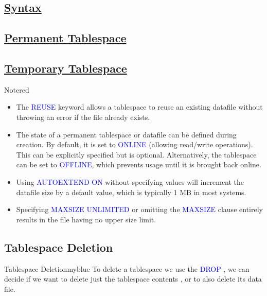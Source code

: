 \vspace{0.15cm}

\subsection*{\underline{Syntax}}

\subsection*{\underline{Permanent Tablespace}}



\subsection*{\underline{Temporary Tablespace}}




\vspace{0.25cm}

\begin{prettyBox}{Note}{red}
\begin{itemize}
    \item The \textcolor{blue}{REUSE} keyword allows a tablespace to reuse an existing 
          datafile without throwing an error if the file already exists.
    \item The state of a permanent tablespace or datafile can be defined during creation. By default, 
          it is set to \textcolor{blue}{ONLINE} (allowing read/write operations). This can be explicitly 
          specified but is optional. Alternatively, the tablespace can be set to 
          \textcolor{blue}{OFFLINE}, which prevents usage until it is brought back online.
    \item Using \textcolor{blue}{AUTOEXTEND ON} without specifying values will increment the datafile 
          size by a default value, which is typically 1 MB in most systems.
    \item Specifying \textcolor{blue}{MAXSIZE UNLIMITED} or omitting the \textcolor{blue}{MAXSIZE} clause entirely 
          results in the file having no upper size limit.
\end{itemize}
\end{prettyBox}

\vspace{0.25cm}
\subsection{Tablespace Deletion}
\begin{prettyBox}{Tablespace Deletion}{myblue}
To delete a tablespace we use the \textcolor{blue}{DROP} , we can decide
if we want to delete just the tablespace contents , or to also delete its data file.
\end{prettyBox}

